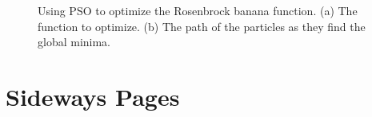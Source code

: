 \documentclass[master]{thesis}
\begin{document}
\vspace{-1em} 
\begin{figure}[p!]
     \hfill
    \caption{Using PSO to optimize the Rosenbrock banana function.  (a)  The function to optimize.  (b)  The path of the particles as they find the global minima.}
\end{figure}

\section{Sideways Pages}
\end{document}
